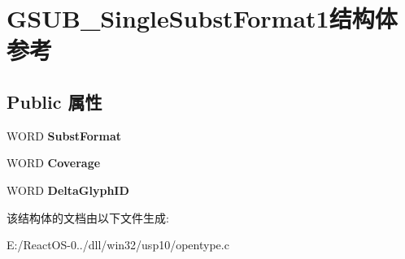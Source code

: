 \hypertarget{struct_g_s_u_b___single_subst_format1}{}\section{G\+S\+U\+B\+\_\+\+Single\+Subst\+Format1结构体 参考}
\label{struct_g_s_u_b___single_subst_format1}
\subsection*{Public 属性}
\begin{DoxyCompactItemize}
\item 
\mbox{\label{struct_g_s_u_b___single_subst_format1_a2c62ec73cf38a2bf4fb1bb0db037bb41}} 
W\+O\+RD {\bfseries Subst\+Format}
\item 
\mbox{\label{struct_g_s_u_b___single_subst_format1_ad0f1dfb47bc659ee54b6e528a82b873b}} 
W\+O\+RD {\bfseries Coverage}
\item 
\mbox{\label{struct_g_s_u_b___single_subst_format1_a73b2b6369e576778eef454db10fabd7e}} 
W\+O\+RD {\bfseries Delta\+Glyph\+ID}
\end{DoxyCompactItemize}


该结构体的文档由以下文件生成\+:\begin{DoxyCompactItemize}
\item 
E\+:/\+React\+O\+S-\/0../dll/win32/usp10/opentype.\+c\end{DoxyCompactItemize}
